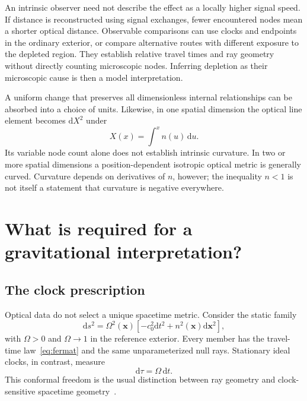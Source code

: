 \documentclass[aps,prd,reprint,nofootinbib]{revtex4-2}
\newcommand{\dd}{\mathrm{d}}
\begin{document}
An intrinsic observer need not describe the effect as a locally higher
signal speed. If distance is reconstructed using signal exchanges,
fewer encountered nodes mean a shorter optical distance. Observable
comparisons can use clocks and endpoints in the ordinary exterior,
or compare alternative routes with different exposure to the depleted
region. They establish relative travel times and ray geometry without
directly counting microscopic nodes. Inferring depletion as their
microscopic cause is then a model interpretation.

A uniform change that preserves all dimensionless internal
relationships can be absorbed into a choice of units. Likewise, in
one spatial dimension the optical line element becomes $\dd X^2$ under
\begin{equation}
 X(x)=\int^x n(u)\,\dd u.
 \label{eq:oned}
\end{equation}
Its variable node count alone does not establish intrinsic curvature.
In two or more spatial dimensions a position-dependent isotropic
optical metric is generally curved. Curvature depends on derivatives
of $n$, however; the inequality $n<1$ is not itself a statement that
curvature is negative everywhere.

\section{What is required for a gravitational interpretation?}
\label{sec:gravity}

\subsection{The clock prescription}

Optical data do not select a unique spacetime metric. Consider the
static family
\begin{equation}
 \dd s^2=\Omega^2(\mathbf x)
       \left[-c_0^2\dd t^2+n^2(\mathbf x)\dd\mathbf x^2\right],
 \label{eq:conformal}
\end{equation}
with $\Omega>0$ and $\Omega\to1$ in the reference exterior. Every member
has the travel-time law~\eqref{eq:fermat} and the same unparameterized
null rays. Stationary ideal clocks, in contrast, measure
\begin{equation}
 \dd\tau=\Omega\,\dd t.
 \label{eq:clock}
\end{equation}
This conformal freedom is the usual distinction between ray geometry
and clock-sensitive spacetime geometry~\cite{VisserAnalog}.
\end{document}
